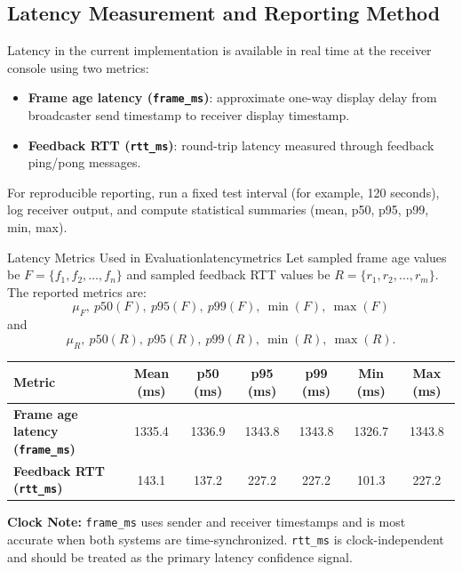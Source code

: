 \documentclass[12pt,a4paper]{article}
\begin{document}
\subsection{Latency Measurement and Reporting Method}
Latency in the current implementation is available in real time at the receiver console using two metrics:
\begin{itemize}[leftmargin=*, itemsep=4pt]
  \item \textbf{Frame age latency (\texttt{frame\_ms})}: approximate one-way display delay from broadcaster send timestamp to receiver display timestamp.
  \item \textbf{Feedback RTT (\texttt{rtt\_ms})}: round-trip latency measured through feedback ping/pong messages.
\end{itemize}

For reproducible reporting, run a fixed test interval (for example, 120 seconds), log receiver output, and compute statistical summaries (mean, p50, p95, p99, min, max).

\begin{definition}{Latency Metrics Used in Evaluation}{latencymetrics}
Let sampled frame age values be \(F = \{f_1, f_2, \dots, f_n\}\) and sampled feedback RTT values be \(R = \{r_1, r_2, \dots, r_m\}\). The reported metrics are:
\[
\mu_F,\ p50(F),\ p95(F),\ p99(F),\ \min(F),\ \max(F)
\]
and
\[
\mu_R,\ p50(R),\ p95(R),\ p99(R),\ \min(R),\ \max(R).
\]
\end{definition}

\begin{center}
\renewcommand{\arraystretch}{1.35}
\begin{tabular}{>{\bfseries}l|c|c|c|c|c|c}
\toprule
Metric & Mean (ms) & p50 (ms) & p95 (ms) & p99 (ms) & Min (ms) & Max (ms) \\
\midrule
Frame age latency (\texttt{frame\_ms}) & 1335.4 & 1336.9 & 1343.8 & 1343.8 & 1326.7 & 1343.8 \\
Feedback RTT (\texttt{rtt\_ms}) & 143.1 & 137.2 & 227.2 & 227.2 & 101.3 & 227.2 \\
\bottomrule
\end{tabular}
\end{center}

\textbf{Clock Note:} \texttt{frame\_ms} uses sender and receiver timestamps and is most accurate when both systems are time-synchronized. \texttt{rtt\_ms} is clock-independent and should be treated as the primary latency confidence signal.

\newpage
\end{document}
